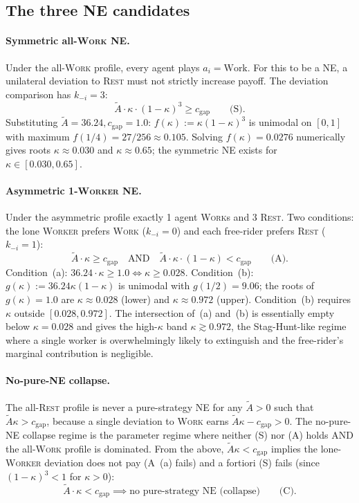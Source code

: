 \documentclass{anvil-paper}
\begin{document}
\subsection{The three NE candidates}
\label{app:nestructure:candidates}

\paragraph{Symmetric all-\textsc{Work} NE.}
Under the all-\textsc{Work} profile, every agent plays $a_i=\text{Work}$.
For this to be a NE, a unilateral deviation to \textsc{Rest} must not
strictly increase payoff. The deviation comparison has $k_{-i}{=}3$:
\[
  \tilde A\cdot\kappa\cdot(1-\kappa)^3 \geq c_{\text{gap}}
  \qquad\text{(S)}.
\]
Substituting $\tilde A{=}36.24,c_{\text{gap}}{=}1.0$: $f(\kappa):=
\kappa(1-\kappa)^3$ is unimodal on $[0,1]$ with maximum
$f(1/4)=27/256\approx 0.105$. Solving $f(\kappa)=0.0276$
numerically gives roots $\kappa\approx 0.030$ and $\kappa\approx 0.65$;
the symmetric NE exists for $\kappa\in[0.030,0.65]$.

\paragraph{Asymmetric 1-\textsc{Worker} NE.}
Under the asymmetric profile exactly 1 agent \textsc{Work}s and 3
\textsc{Rest}. Two conditions: the lone \textsc{Worker} prefers
\textsc{Work} ($k_{-i}{=}0$) and each free-rider prefers \textsc{Rest}
($k_{-i}{=}1$):
\[
  \tilde A\cdot\kappa\geq c_{\text{gap}}
  \quad\text{AND}\quad
  \tilde A\cdot\kappa\cdot(1-\kappa)<c_{\text{gap}}
  \qquad\text{(A)}.
\]
Condition~(a): $36.24\cdot\kappa\geq 1.0\Leftrightarrow\kappa\geq 0.028$.
Condition~(b): $g(\kappa):=36.24\kappa(1-\kappa)$ is unimodal with
$g(1/2)=9.06$; the roots of $g(\kappa)=1.0$ are $\kappa\approx 0.028$
(lower) and $\kappa\approx 0.972$ (upper). Condition~(b) requires
$\kappa$ outside $[0.028,0.972]$. The intersection of~(a) and~(b) is
essentially empty below $\kappa{=}0.028$ and gives the high-$\kappa$
band $\kappa\gtrsim 0.972$, the Stag-Hunt-like regime where a single
worker is overwhelmingly likely to extinguish and the free-rider's
marginal contribution is negligible.

\paragraph{No-pure-NE collapse.}
The all-\textsc{Rest} profile is never a pure-strategy NE for any
$\tilde A>0$ such that $\tilde A\kappa>c_{\text{gap}}$, because a single
deviation to \textsc{Work} earns $\tilde A\kappa-c_{\text{gap}}>0$. The
no-pure-NE collapse regime is the parameter regime where neither (S)
nor (A) holds AND the all-\textsc{Work} profile is dominated. From the
above, $\tilde A\kappa<c_{\text{gap}}$ implies the lone-\textsc{Worker}
deviation does not pay (A~(a) fails) and a fortiori (S) fails (since
$(1-\kappa)^3<1$ for $\kappa>0$):
\[
  \tilde A\cdot\kappa < c_{\text{gap}}
  \implies \text{no pure-strategy NE (collapse)}
  \qquad\text{(C)}.
\]
\end{document}
